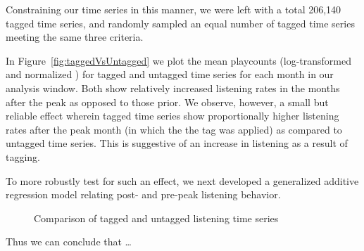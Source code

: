 Constraining our time series in this manner, we were left with a total 206,140 tagged time series, and randomly sampled an equal number of tagged time series meeting the same three criteria.

In Figure~\ref{fig:taggedVsUntagged} we plot the mean playcounts (log-transformed and normalized ) for tagged and untagged time series for each month in our analysis window. Both show relatively increased listening rates in the months after the peak as opposed to those prior. We observe, however, a small but reliable  effect wherein tagged time series show proportionally higher listening rates after the peak month (in which the the tag was applied) as compared to untagged time series. This is suggestive of an increase in listening as a result of tagging.

To more robustly test for such an effect, we next developed a generalized additive regression model relating post- and pre-peak listening behavior. 


  \begin{figure}
    \hfill
    \caption{Comparison of tagged and untagged listening time series}
    \label{fig:dummy}
  \end{figure}

Thus we can conclude that \ldots {}

